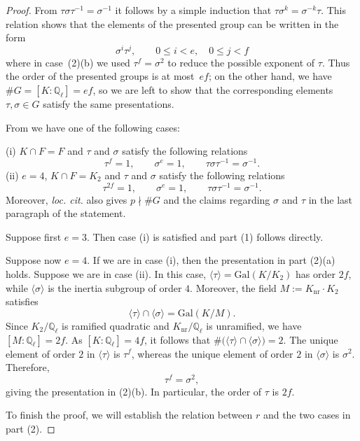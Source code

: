 \documentclass[12pt]{amsart}
\numberwithin{equation}{section}
\theoremstyle{definition}
\newcommand{\Q}{\mathbb{Q}}
\newcommand{\Gal}{\text{Gal}}
\begin{document}
\begin{proof} 
From $\tau \sigma \tau^{-1} = \sigma^{-1}$ it follows by a simple induction that $\tau\sigma^k = \sigma^{-k}\tau$. This relation
 shows that the elements of the presented group can be written in the
form
\[
\sigma^i\tau^j,
\qquad
0\leq i<e,\quad 0\leq j<f
\]
where in case~\textup{(2)(b)} we used
\(\tau^f=\sigma^2\) to reduce the possible exponent of \(\tau\).
Thus the order of the presented groups is at most~\(ef\); on the other hand,
we have $\#G=[K:\Q_\ell]=ef$, so we are left to show that 
the corresponding elements $\tau, \sigma \in G$ satisfy the same presentations.

From \cite[Lemma 9 and Proposition 9]{symplectic} we have one of the following cases:

(i) $K\cap F= F$ and $\tau$ and $\sigma$ satisfy the following relations
\[
\tau ^f=1, \qquad \sigma ^e=1,\qquad \tau \sigma \tau ^{-1} = \sigma ^{-1}. 
\]
(ii) $e=4$, $K\cap F= K_2$ and 
$\tau$ and $\sigma$ satisfy the following relations
\[
\tau ^{2f}=1, \qquad \sigma ^e=1,\qquad \tau \sigma \tau ^{-1} = \sigma ^{-1}. 
\]
Moreover, \textit{loc. cit.} also gives $p\nmid \# G$ and the claims regarding $\sigma$ and $\tau$ in the last paragraph of the statement.

Suppose first $e=3$. Then case (i) is satisfied and part (1) follows directly. 

Suppose now $e=4$. If we are in case (i), then the presentation in part (2)(a) holds. Suppose we are in case (ii).
In this case,
$\langle\tau\rangle=\Gal(K/K_2)$ has order $2f$, while
$\langle\sigma\rangle$ is the inertia subgroup of order $4$.
Moreover, the field $M:=K_{\mathrm{nr}}\cdot K_2$ satisfies
\[
 \langle\tau\rangle\cap\langle\sigma\rangle
 =
 \Gal(K/M).
\]
Since $K_2/\Q_\ell$ is ramified quadratic and
$K_{\mathrm{nr}}/\Q_\ell$ is unramified, we have
$[M:\Q_\ell]=2f.$
As $[K:\Q_\ell]=4f$, it follows that
$\#\bigl(\langle\tau\rangle\cap\langle\sigma\rangle\bigr)=2.$
The unique element of order $2$ in $\langle\tau\rangle$ is $\tau^f$,
whereas the unique element of order $2$ in
$\langle\sigma\rangle$ is $\sigma^2$. Therefore, $$ \tau^f=\sigma^2,$$ 
giving the presentation in (2)(b). In particular, the order of $\tau$ is $2f$.

To finish the proof, we will establish the relation between $r$ and the two cases in part (2).


\end{proof}
\end{document}
